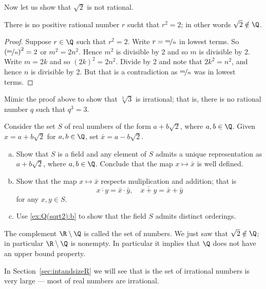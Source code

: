 \documentclass[12pt]{book}
\begin{document}
Now let us show that $\sqrt{2}$ is not rational.

\begin{prop} 
There is no positive rational number $r$ sucht that $r^2=2$;
in other words $\sqrt{2}\notin\Q$.
\end{prop}


\begin{proof}
Suppose $r \in \Q$ such that $r^2 = 2$.
Write $r=\nicefrac{m}{n}$ in lowest terms.  
So ${(\nicefrac{m}{n})}^2 = 2$ or $m^2 = 2n^2$.  
Hence $m^2$ is divisible by 2 and so $m$ is divisible by 2.  
Write $m = 2k$ and so ${(2k)}^2 = 2n^2$.  
Divide by 2 and note that $2k^2 = n^2$, and hence $n$ is divisible by 2.
But that is a contradiction as $\nicefrac{m}{n}$ was in lowest terms.
\end{proof}

\begin{exercise}
Mimic the proof above to show that $\sqrt[3]{3}$ is irrational;
that is, there is no rational number $q$ such that $q^3=3$.
\end{exercise}

\begin{exercise}
Consider the set $S$ of real numbers of the form $a+b\sqrt{2}$, where $a,b\in\Q$.
Given $x=a+b\sqrt{2}$ for $a,b\in\Q$, set $\bar x=a-b\sqrt{2}$.
\begin{enumerate}[a)]
\item Show that $S$ is a field and any element of $S$ admits a unique representation as $a+b\sqrt{2}$, where $a,b\in\Q$. Conclude that the map $x\mapsto \bar x$ is well defined.
\item\label{ex:Q(sqrt2):b} Show that the map $x\mapsto \bar x$ respects muliplication and addition; that is 
 \[\overline{x\cdot y}=\bar x\cdot \bar y,\quad \overline{x+y}=\bar x+\bar y\]
for any $x,y\in S$. 
\item Use \ref{ex:Q(sqrt2):b} to show that the field $S$ admits distinct orderings.
\end{enumerate}


\end{exercise}


The complement $\R \setminus \Q$ is called the set of \emph{} numbers.  
We just saw that $\sqrt{2} \notin \Q$;
in particular $\R \setminus \Q$ is nonempty.
In particular it implies that $\Q$ does not have an upper bound property.


In Section~\ref{sec:intandsizeR} we will see that is the set of irrational numbers is very large --- most of real numbers are irrational.
\end{document}
